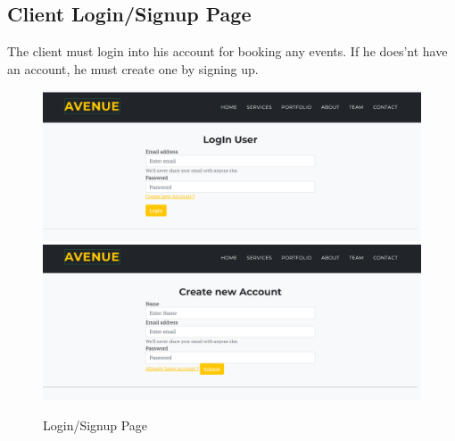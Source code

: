 \subsection{Client Login/Signup Page}
The client must login into his account for booking any events. If he does'nt have an account, he must create one by signing up.
\begin{figure}[H]
	\centering
	\includegraphics[scale=0.2]{login.png}\newline\newline
	\includegraphics[scale=0.2]{signup.png}
	\caption{Login/Signup Page}
	\label{Login/Signup Page}
\end{figure}
